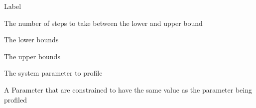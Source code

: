 
 {Label}

 {The number of steps to take between the lower and upper bound}

 {The lower bounds}

 {The upper bounds}

 {The system parameter to profile}

 {A Parameter that are constrained to have the same value as the parameter being profiled}

